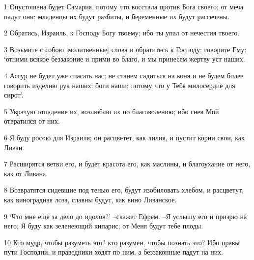 \par 1 Опустошена будет Самария, потому что восстала против Бога своего; от меча падут они; младенцы их будут разбиты, и беременные их будут рассечены.
\par 2 Обратись, Израиль, к Господу Богу твоему; ибо ты упал от нечестия твоего.
\par 3 Возьмите с собою [молитвенные] слова и обратитесь к Господу; говорите Ему: `отними всякое беззаконие и прими во благо, и мы принесем жертву уст наших.
\par 4 Ассур не будет уже спасать нас; не станем садиться на коня и не будем более говорить изделию рук наших: боги наши; потому что у Тебя милосердие для сирот'.
\par 5 Уврачую отпадение их, возлюблю их по благоволению; ибо гнев Мой отвратился от них.
\par 6 Я буду росою для Израиля; он расцветет, как лилия, и пустит корни свои, как Ливан.
\par 7 Расширятся ветви его, и будет красота его, как маслины, и благоухание от него, как от Ливана.
\par 8 Возвратятся сидевшие под тенью его, будут изобиловать хлебом, и расцветут, как виноградная лоза, славны будут, как вино Ливанское.
\par 9 `Что мне еще за дело до идолов?' --скажет Ефрем. --Я услышу его и призрю на него; Я буду как зеленеющий кипарис; от Меня будут тебе плоды.
\par 10 Кто мудр, чтобы разуметь это? кто разумен, чтобы познать это? Ибо правы пути Господни, и праведники ходят по ним, а беззаконные падут на них.


